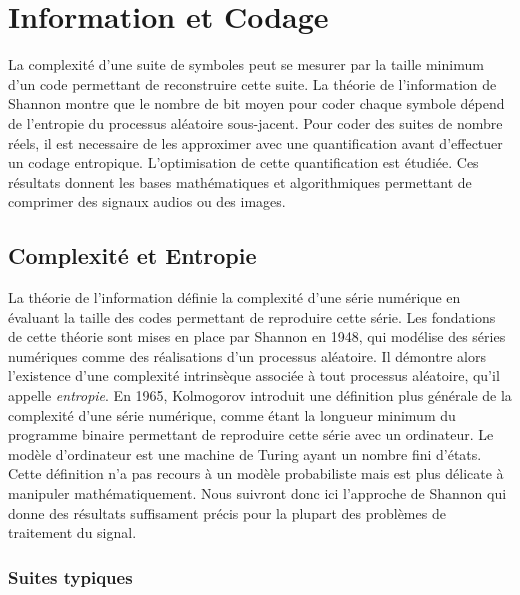 \chapter{Information et Codage}
\label{info-chap}

La complexit\'e d'une suite de symboles
peut se mesurer par la taille minimum d'un code
permettant de reconstruire cette suite.
La th\'eorie de l'information de Shannon montre que le nombre
de bit moyen pour coder chaque symbole d\'epend de l'entropie
du processus al\'eatoire sous-jacent. 
Pour coder des suites de nombre r\'eels, il est necessaire
de les approximer avec une quantification avant d'effectuer
un codage entropique. 
L'optimisation de cette quantification est \'etudi\'ee.
Ces r\'esultats donnent les bases math\'ematiques
et algorithmiques permettant de 
comprimer des signaux audios ou des images.

\section{Complexit\'e et Entropie}

La th\'eorie de l'information d\'efinie la complexit\'e d'une
s\'erie num\'erique en \'evaluant la taille des codes permettant
de reproduire cette s\'erie. Les fondations de cette th\'eorie
sont mises en place par Shannon en 1948, qui mod\'elise
des s\'eries num\'eriques comme des r\'ealisations d'un processus
al\'eatoire. Il d\'emontre alors
l'existence d'une complexit\'e intrins\`eque associ\'ee \`a tout
processus al\'eatoire, qu'il appelle {\it entropie}.
En 1965, Kolmogorov introduit une d\'efinition plus
g\'en\'erale de la complexit\'e d'une s\'erie num\'erique,
comme \'etant la longueur minimum du programme binaire
permettant de reproduire cette s\'erie avec un ordinateur.
Le mod\`ele d'ordinateur est une machine de Turing ayant un
nombre fini d'\'etats.
Cette d\'efinition n'a pas recours \`a un mod\`ele probabiliste
mais est plus d\'elicate \`a manipuler math\'ematiquement.
Nous suivront donc ici l'approche de Shannon qui donne des
r\'esultats suffisament pr\'ecis pour la plupart des
probl\`emes de traitement du signal.

\subsection{Suites typiques}

